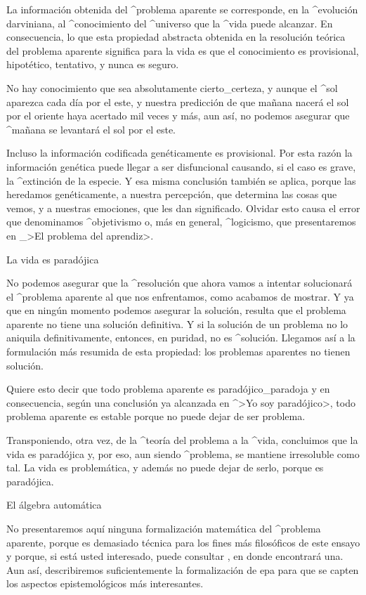 La información obtenida del ^{problema aparente} se corresponde, en la
^{evolución} darviniana, al ^{conocimiento} del ^{universo} que la
^{vida} puede alcanzar. En consecuencia, lo que esta propiedad abstracta
obtenida en la resolución teórica del problema aparente significa para
la vida es que el conocimiento es provisional, hipotético, tentativo, y
nunca es seguro.

No hay conocimiento que sea absolutamente cierto_{certeza}, y aunque el
^{sol} aparezca cada día por el este, y nuestra predicción de que mañana
nacerá el sol por el oriente haya acertado mil veces y más, aun así, no
podemos asegurar que ^{mañana} se levantará el sol por el este.

Incluso la información codificada genéticamente es provisional. Por esta
razón la información genética puede llegar a ser disfuncional causando,
si el caso es grave, la ^{extinción} de la especie. Y esa misma
conclusión también se aplica, porque las heredamos genéticamente, a
nuestra percepción, que determina las cosas que vemos, y a nuestras
emociones, que les dan significado. Olvidar esto causa el error que
denominamos ^{objetivismo} o, más en general, ^{logicismo}, que
presentaremos en _>El problema del aprendiz>.


\Section La vida es paradójica

No podemos asegurar que la ^{resolución} que ahora vamos a intentar
solucionará el ^{problema aparente} al que nos enfrentamos, como
acabamos de mostrar. Y ya que en ningún momento podemos asegurar la
solución, resulta que el problema aparente no tiene una solución
definitiva. Y si la solución de un problema no lo aniquila
definitivamente, entonces, en puridad, no es ^{solución}. Llegamos así a
la formulación más resumida de esta propiedad: los problemas aparentes
no tienen solución.

Quiere esto decir que todo problema aparente es paradójico_{paradoja} y
en consecuencia, según una conclusión ya alcanzada en ^>Yo soy
paradójico>, todo problema aparente es estable porque no puede dejar de
ser problema.

Transponiendo, otra vez, de la ^{teoría del problema} a la ^{vida},
concluimos que la vida es paradójica y, por eso, aun siendo ^{problema},
se mantiene irresoluble como tal. La vida es problemática, y además no
puede dejar de serlo, porque es paradójica.


\Section El álgebra automática

No presentaremos aquí ninguna formalización matemática del ^{problema
aparente}, porque es demasiado técnica para los fines más filosóficos de
este ensayo y porque, si está usted interesado, puede consultar
, en donde encontrará una. Aun así, describiremos
suficientemente la formalización de {\sc epa} para que se capten los
aspectos epistemológicos más interesantes.

